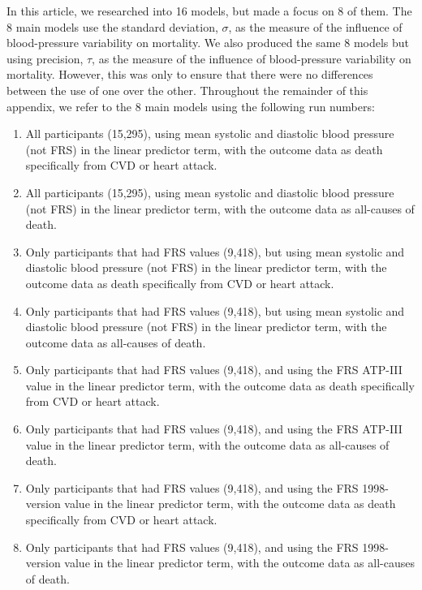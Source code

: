 \documentclass[
]{article}
\begin{document}
In this article, we researched into 16 models, but made a focus on 8 of
them. The 8 main models use the standard deviation, \(\sigma\), as the
measure of the influence of blood-pressure variability on mortality. We
also produced the same 8 models but using precision, \(\tau\), as the
measure of the influence of blood-pressure variability on mortality.
However, this was only to ensure that there were no differences between
the use of one over the other. Throughout the remainder of this
appendix, we refer to the 8 main models using the following run numbers:

\begin{enumerate}\label{runnums}
\item All participants (15,295), using mean systolic and diastolic blood pressure (not FRS) in the linear predictor term, with the outcome data as death specifically from CVD or heart attack.
\item All participants (15,295), using mean systolic and diastolic blood pressure (not FRS) in the linear predictor term, with the outcome data as all-causes of death.
\item Only participants that had FRS values (9,418), but using mean systolic and diastolic blood pressure (not FRS) in the linear predictor term, with the outcome data as death specifically from CVD or heart attack.
\item Only participants that had FRS values (9,418), but using mean systolic and diastolic blood pressure (not FRS) in the linear predictor term, with the outcome data as all-causes of death.
\item Only participants that had FRS values (9,418), and using the FRS ATP-III value in the linear predictor term, with the outcome data as death specifically from CVD or heart attack.
\item Only participants that had FRS values (9,418), and using the FRS ATP-III value in the linear predictor term, with the outcome data as all-causes of death.
\item Only participants that had FRS values (9,418), and using the FRS 1998-version value in the linear predictor term, with the outcome data as death specifically from CVD or heart attack.
\item Only participants that had FRS values (9,418), and using the FRS 1998-version value in the linear predictor term, with the outcome data as all-causes of death.
\end{enumerate}
\end{document}
